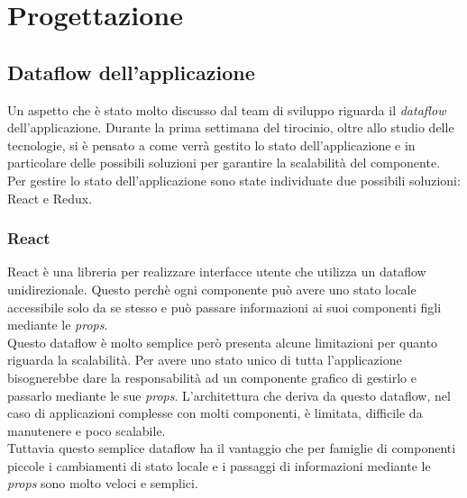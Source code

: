 
\chapter{Progettazione}
\label{cap:progettazione}


\section{Dataflow dell'applicazione}
Un aspetto che è stato molto discusso dal team di sviluppo riguarda il \emph{dataflow} dell'applicazione. Durante la prima settimana del tirocinio, oltre allo studio delle tecnologie, si è pensato a come verrà gestito lo stato dell'applicazione e in particolare delle possibili soluzioni per garantire la scalabilità del componente. Per gestire lo stato dell'applicazione sono state individuate due possibili soluzioni: React e Redux.

\subsection{React}
React è una libreria per realizzare interfacce utente che utilizza un dataflow unidirezionale. Questo perchè ogni componente può avere uno stato locale accessibile solo da se stesso e può passare informazioni ai suoi componenti figli mediante le \emph{props}. \\
Questo dataflow è molto semplice però presenta alcune limitazioni per quanto riguarda la scalabilità. Per avere uno stato unico di tutta l'applicazione bisognerebbe dare la responsabilità ad un componente grafico di gestirlo e passarlo mediante le sue \emph{props}. L'architettura che deriva da questo dataflow, nel caso di applicazioni complesse con molti componenti, è limitata, difficile da manutenere e poco scalabile. \\
Tuttavia questo semplice dataflow ha il vantaggio che per famiglie di componenti piccole i cambiamenti di stato locale e i passaggi di informazioni mediante le \emph{props} sono molto veloci e semplici.

